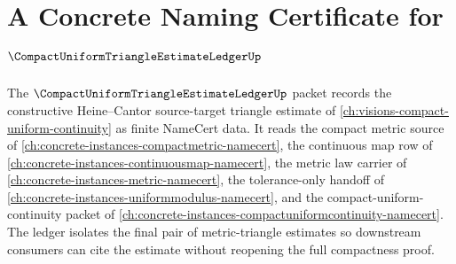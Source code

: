 \chapter{A Concrete Naming Certificate for $\CompactUniformTriangleEstimateLedgerUp$}
\label{ch:concrete-instances-compact-uniform-triangle-estimate-ledger-namecert}

The $\CompactUniformTriangleEstimateLedgerUp$ packet records the constructive Heine--Cantor source-target triangle estimate of \autoref{ch:visions-compact-uniform-continuity} as finite NameCert data. It reads the compact metric source of \autoref{ch:concrete-instances-compactmetric-namecert}, the continuous map row of \autoref{ch:concrete-instances-continuousmap-namecert}, the metric law carrier of \autoref{ch:concrete-instances-metric-namecert}, the tolerance-only handoff of \autoref{ch:concrete-instances-uniformmodulus-namecert}, and the compact-uniform-continuity packet of \autoref{ch:concrete-instances-compactuniformcontinuity-namecert}. The ledger isolates the final pair of metric-triangle estimates so downstream consumers can cite the estimate without reopening the full compactness proof.

